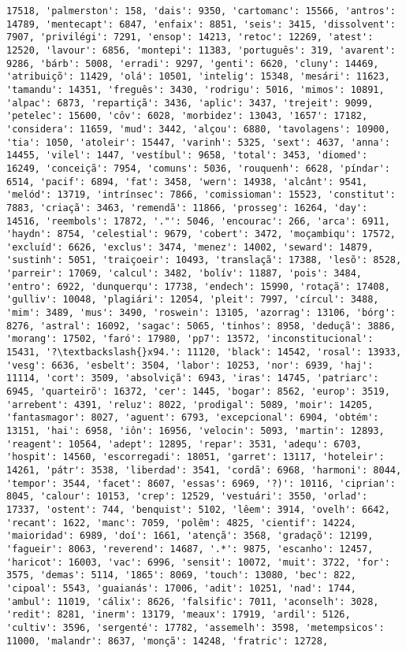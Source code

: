 \begin{Verbatim}[commandchars=\\\{\}]
17518, 'palmerston': 158, 'dais': 9350, 'cartomanc': 15566, 'antros': 14789, 'mentecapt': 6847, 'enfaix': 8851, 'seis': 3415, 'dissolvent': 7907, 'privilégi': 7291, 'ensop': 14213, 'retoc': 12269, 'atest': 12520, 'lavour': 6856, 'montepi': 11383, 'português': 319, 'avarent': 9286, 'bárb': 5008, 'erradi': 9297, 'genti': 6620, 'cluny': 14469, 'atribuiçõ': 11429, 'olá': 10501, 'intelig': 15348, 'mesári': 11623, 'tamandu': 14351, 'freguês': 3430, 'rodrigu': 5016, 'mimos': 10891, 'alpac': 6873, 'repartiçã': 3436, 'aplic': 3437, 'trejeit': 9099, 'petelec': 15600, 'côv': 6028, 'morbidez': 13043, '1657': 17182, 'considera': 11659, 'mud': 3442, 'alçou': 6880, 'tavolagens': 10900, 'tia': 1050, 'atoleir': 15447, 'varinh': 5325, 'sext': 4637, 'anna': 14455, 'vilel': 1447, 'vestíbul': 9658, 'total': 3453, 'diomed': 16249, 'conceiçã': 7954, 'comuns': 5036, 'rouquenh': 6628, 'píndar': 6514, 'pacif': 6894, 'fat': 3458, 'wern': 14938, 'alcânt': 9541, 'melód': 13719, 'intrínsec': 7866, 'comissioman': 15523, 'constitut': 7883, 'criaçã': 3463, 'remendã': 11866, 'prosseg': 16264, 'day': 14516, 'reembols': 17872, '."': 5046, 'encourac': 266, 'arca': 6911, 'haydn': 8754, 'celestial': 9679, 'cobert': 3472, 'moçambiqu': 17572, 'excluíd': 6626, 'exclus': 3474, 'menez': 14002, 'seward': 14879, 'sustinh': 5051, 'traiçoeir': 10493, 'translaçã': 17388, 'lesõ': 8528, 'parreir': 17069, 'calcul': 3482, 'bolív': 11887, 'pois': 3484, 'entro': 6922, 'dunquerqu': 17738, 'endech': 15990, 'rotaçã': 17408, 'gulliv': 10048, 'plagiári': 12054, 'pleit': 7997, 'círcul': 3488, 'mim': 3489, 'mus': 3490, 'roswein': 13105, 'azorrag': 13106, 'bórg': 8276, 'astral': 16092, 'sagac': 5065, 'tinhos': 8958, 'deduçã': 3886, 'morang': 17502, 'faró': 17980, 'pp7': 13572, 'inconstitucional': 15431, '?\textbackslash{}x94.': 11120, 'black': 14542, 'rosal': 13933, 'vesg': 6636, 'esbelt': 3504, 'labor': 10253, 'nor': 6939, 'haj': 11114, 'cort': 3509, 'absolviçã': 6943, 'iras': 14745, 'patriarc': 6945, 'quarteirõ': 16372, 'cer': 1445, 'bogar': 8562, 'europ': 3519, 'arrebent': 4391, 'reluz': 8022, 'prodigal': 5089, 'moir': 14205, 'fantasmagor': 8027, 'aguent': 6793, 'excepcional': 6904, 'obtém': 13151, 'hai': 6958, 'iôn': 16956, 'velocin': 5093, 'martin': 12893, 'reagent': 10564, 'adept': 12895, 'repar': 3531, 'adequ': 6703, 'hospit': 14560, 'escorregadi': 18051, 'garret': 13117, 'hoteleir': 14261, 'pátr': 3538, 'liberdad': 3541, 'cordã': 6968, 'harmoni': 8044, 'tempor': 3544, 'facet': 8607, 'essas': 6969, '?)': 10116, 'ciprian': 8045, 'calour': 10153, 'crep': 12529, 'vestuári': 3550, 'orlad': 17337, 'ostent': 744, 'benquist': 5102, 'lêem': 3914, 'ovelh': 6642, 'recant': 1622, 'manc': 7059, 'polêm': 4825, 'cientif': 14224, 'maioridad': 6989, 'doí': 1661, 'atençã': 3568, 'gradaçõ': 12199, 'fagueir': 8063, 'reverend': 14687, '.*': 9875, 'escanho': 12457, 'haricot': 16003, 'vac': 6996, 'sensit': 10072, 'muit': 3722, 'for': 3575, 'demas': 5114, '1865': 8069, 'touch': 13080, 'bec': 822, 'cipoal': 5543, 'guaianás': 17006, 'adit': 10251, 'nad': 1744, 'ambul': 11019, 'cálix': 8626, 'falsific': 7011, 'aconselh': 3028, 'redit': 8281, 'inerm': 13179, 'meaux': 17919, 'ardil': 5126, 'cultiv': 3596, 'sergenté': 17782, 'assemelh': 3598, 'metempsicos': 11000, 'malandr': 8637, 'monçã': 14248, 'fratric': 12728, 
\end{Verbatim}
